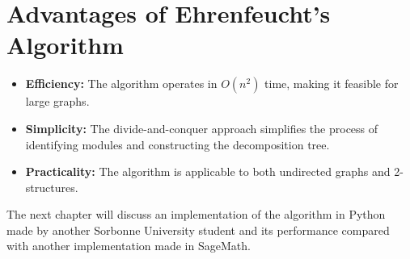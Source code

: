 \section{Advantages of Ehrenfeucht's Algorithm}\label{sec:advantages-of-ehrenfeucht's-algorithm}

\begin{itemize}
    \item \textbf{Efficiency:} The algorithm operates in $O(n^2)$ time, making it feasible for large graphs.
    \item \textbf{Simplicity:} The divide-and-conquer approach simplifies the process of identifying modules and constructing the decomposition tree.
    \item \textbf{Practicality:} The algorithm is applicable to both undirected graphs and 2-structures.
\end{itemize}


\hspace{4cm}

The next chapter will discuss an implementation of the algorithm in Python made by another Sorbonne University student and its performance compared with another implementation made in SageMath.

